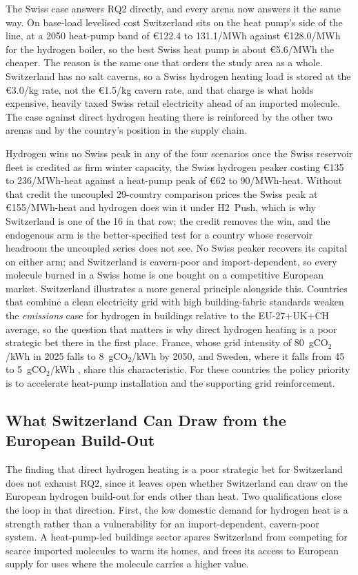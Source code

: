 The Swiss case answers RQ2 directly, and every arena now answers it the same way. On
base-load levelised cost Switzerland sits on the heat pump's side of the line, at a 2050
heat-pump band of \euro{}122.4 to 131.1/MWh against \euro{}128.0/MWh for the hydrogen
boiler, so the best Swiss heat pump is about \euro{}5.6/MWh the cheaper. The reason is
the same one that orders the study area as a whole. Switzerland has no salt caverns, so
a Swiss hydrogen heating load is stored at the \euro{}3.0/kg rate, not the \euro{}1.5/kg
cavern rate, and that charge is what holds expensive, heavily taxed Swiss retail
electricity ahead of an imported molecule. The case against direct hydrogen heating
there is reinforced by the other two arenas and by the country's position in the supply
chain.

Hydrogen wins no Swiss peak in any of the four scenarios once the Swiss reservoir fleet
is credited as firm winter capacity, the Swiss hydrogen peaker costing \euro{}135 to
236/MWh-heat against a heat-pump peak of \euro{}62 to 90/MWh-heat. Without that credit the
uncoupled 29-country comparison prices the Swiss peak at \euro{}155/MWh-heat and hydrogen
does win it under H2~Push, which is why Switzerland is one of the 16 in that row; the
credit removes the win, and the endogenous arm is the better-specified test for a
country whose reservoir headroom the uncoupled series does not see. No Swiss peaker
recovers its capital on either arm; and Switzerland is cavern-poor and import-dependent, so
every molecule burned in a Swiss home is one bought on a competitive European market.
Switzerland illustrates a more general principle alongside this. Countries that combine
a clean electricity grid with high building-fabric standards weaken the \emph{emissions}
case for hydrogen in buildings relative to the EU-27+UK+CH average, so the question
that matters is why direct hydrogen heating is a poor strategic bet there in the first
place. France, whose
grid intensity of 80~gCO$_2$/kWh in 2025 falls to 8~gCO$_2$/kWh by 2050, and Sweden,
where it falls from 45 to 5~gCO$_2$/kWh \citep{EMBER2024electricity, EEA2023fit55},
share this characteristic. For these countries the policy priority is to accelerate
heat-pump installation and the supporting grid reinforcement.

\subsection{What Switzerland Can Draw from the European Build-Out}
\label{sec:discussion:swissstrategy} The finding that direct hydrogen heating is a poor
strategic bet for Switzerland does not exhaust RQ2, since it leaves open whether
Switzerland can draw on the European hydrogen build-out for ends other than heat. Two qualifications close the loop in that
direction. First, the low domestic demand for hydrogen heat is a strength rather than a
vulnerability for an import-dependent, cavern-poor system. A heat-pump-led buildings
sector spares Switzerland from competing for scarce imported molecules to warm its
homes, and frees its access to European supply for uses where the molecule carries a
higher value.

